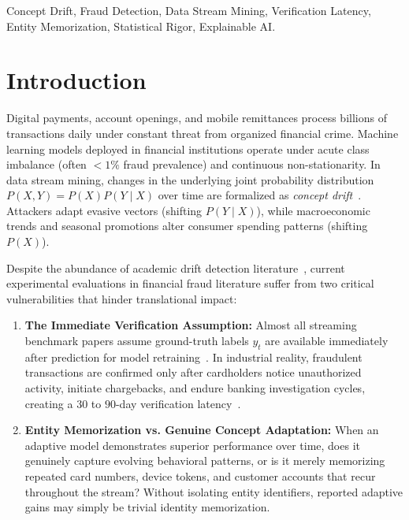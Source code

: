 \documentclass[10pt,conference,compsoc]{IEEEtran}
\begin{document}
\begin{IEEEkeywords}
Concept Drift, Fraud Detection, Data Stream Mining, Verification Latency, Entity Memorization, Statistical Rigor, Explainable AI.
\end{IEEEkeywords}

\section{Introduction}
\label{sec:intro}

Digital payments, account openings, and mobile remittances process billions of transactions daily under constant threat from organized financial crime. Machine learning models deployed in financial institutions operate under acute class imbalance (often $< 1\%$ fraud prevalence) and continuous non-stationarity. In data stream mining, changes in the underlying joint probability distribution $P(X, Y) = P(X)P(Y \mid X)$ over time are formalized as \textit{concept drift}~\cite{lu2018learning, gama2004learning}. Attackers adapt evasive vectors (shifting $P(Y \mid X)$), while macroeconomic trends and seasonal promotions alter consumer spending patterns (shifting $P(X)$).

Despite the abundance of academic drift detection literature~\cite{bifet2007learning, gama2004learning}, current experimental evaluations in financial fraud literature suffer from two critical vulnerabilities that hinder translational impact:

\begin{enumerate}
    \item \textbf{The Immediate Verification Assumption:} Almost all streaming benchmark papers assume ground-truth labels $y_t$ are available immediately after prediction for model retraining~\cite{dalpozzolo2015credit}. In industrial reality, fraudulent transactions are confirmed only after cardholders notice unauthorized activity, initiate chargebacks, and endure banking investigation cycles, creating a $30$ to $90$-day verification latency~\cite{carcillo2018scarff}.
    \item \textbf{Entity Memorization vs. Genuine Concept Adaptation:} When an adaptive model demonstrates superior performance over time, does it genuinely capture evolving behavioral patterns, or is it merely memorizing repeated card numbers, device tokens, and customer accounts that recur throughout the stream? Without isolating entity identifiers, reported adaptive gains may simply be trivial identity memorization.
\end{enumerate}
\end{document}

